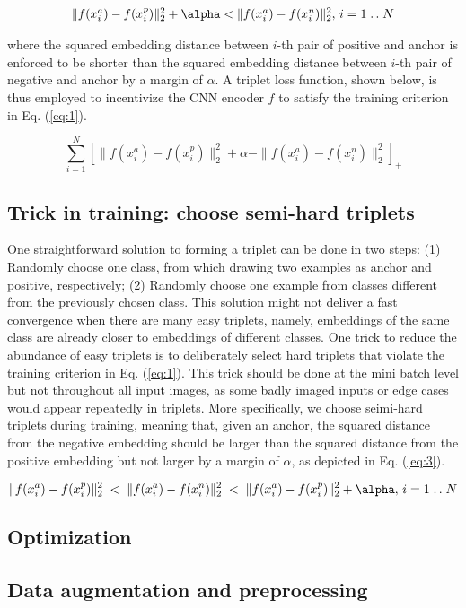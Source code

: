 \newcommand{\isep}{\mathrel{{.}\,{.}}\nobreak}
\begin{equation} \label{eq:1}
    \begin{array}{l}
       \|f(x_i^a) - f(x_i^p)\|_2^2 + \alpha < \|f(x_i^a) - f(x_i^n)\|_2^2, \, i = 1 \isep N
    \end{array}
\end{equation}

where the squared embedding distance between $i$-th pair of positive and anchor
is enforced to be shorter than the squared embedding distance between $i$-th
pair of negative and anchor by a margin of $\alpha$.  A triplet loss function,
shown below, is thus employed to incentivize the CNN encoder $f$ to satisfy the
training criterion in Eq. (\ref{eq:1}).

\begin{equation}
    \sum_{i=1}^{N} \left[ \|f(x_i^a) - f(x_i^p)\|_2^2 + \alpha - \|f(x_i^a) -
    f(x_i^n)\|_2^2 \right]_+
\end{equation}


\subsection{Trick in training: choose semi-hard triplets}

One straightforward solution to forming a triplet can be done in two steps: (1)
Randomly choose one class, from which drawing two examples as anchor and
positive, respectively; (2) Randomly choose one example from classes different
from the previously chosen class.  This solution might not deliver a fast
convergence when there are many easy triplets, namely, embeddings of the same
class are already closer to embeddings of different classes.  One trick to
reduce the abundance of easy triplets is to deliberately select hard triplets
that violate the training criterion in Eq. (\ref{eq:1}).  This trick should be
done at the mini batch level but not throughout all input images, as some badly
imaged inputs or edge cases would appear repeatedly in triplets.  More
specifically, we choose seimi-hard triplets during training, meaning that, given
an anchor, the squared distance from the negative embedding should be larger
than the squared distance from the positive embedding but not larger by a margin
of $\alpha$, as depicted in Eq. (\ref{eq:3}).

\begin{equation}\label{eq:3}
    \|f(x_i^a) - f(x_i^p)\|_2^2 \;<\; \|f(x_i^a) - f(x_i^n)\|_2^2 \;<\; \|f(x_i^a) - f(x_i^p)\|_2^2 + \alpha, \, i = 1 \isep N
\end{equation}


\subsection{Optimization}


\subsection{Data augmentation and preprocessing}
